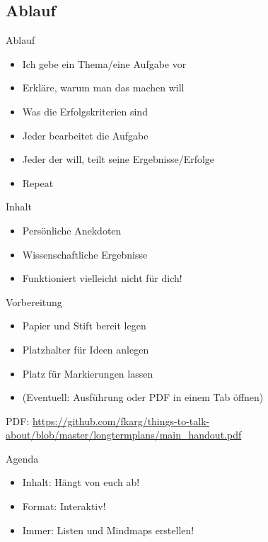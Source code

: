 \subsection{Ablauf}


\begin{frame}[c]{Ablauf}
    \begin{itemize}[<+(1)->]
        \item Ich gebe ein Thema/eine Aufgabe vor
        \item Erkläre, warum man das machen will
        \item Was die Erfolgskriterien sind
        \item Jeder bearbeitet die Aufgabe
        \item Jeder der will, teilt seine Ergebnisse/Erfolge
        \item Repeat
    \end{itemize}
\end{frame}


\begin{frame}[c]{Inhalt}
    \large
    \begin{itemize}[<+(1)->]
        \item Persönliche Anekdoten
        \item Wissenschaftliche Ergebnisse
        \item Funktioniert vielleicht nicht für dich!
    \end{itemize}
\end{frame}


\begin{frame}[c]{Vorbereitung}
    \begin{itemize}[<+(1)->]
        \item Papier und Stift bereit legen
        \item Platzhalter für Ideen anlegen
        \item Platz für Markierungen lassen
        \item (Eventuell: Ausführung \cite{longtermplans-post} oder PDF \cite{longtermplans-pdf} in einem Tab öffnen)
    \end{itemize}
    \pause
    PDF: \url{https://github.com/fkarg/things-to-talk-about/blob/master/longtermplans/main_handout.pdf}
\end{frame}


\begin{frame}[c]{Agenda}
    \large
    \begin{itemize}[<+(1)->]
        \item Inhalt: Hängt von euch ab!
        \item Format: Interaktiv!
        \item Immer: Listen und Mindmaps erstellen!
    \end{itemize}
\end{frame}


%
%
